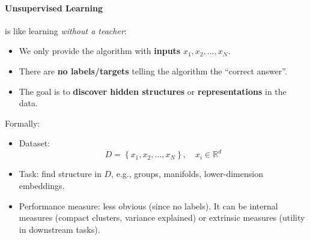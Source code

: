 \paragraph{Unsupervised Learning}\label{sec:unsupervised-learning}

 is like learning \emph{without a teacher}:
\begin{itemize}
    \item We only provide the algorithm with \textbf{inputs} $x_{1}, x_{2}, \dots, x_{N}$.
    \item There are \textbf{no labels/targets} telling the algorithm the ``correct answer''.
    \item The goal is to \textbf{discover hidden structures} or \textbf{representations} in the data.
\end{itemize}
Formally:
\begin{itemize}
    \item Dataset:
    \begin{equation*}
        D = \left\{x_{1}, x_{2}, \dots, x_{N}\right\}, \quad x_{i} \in \mathbb{R}^{d}
    \end{equation*}
    \item Task: find structure in $D$, e.g., groups, manifolds, lower-dimension embeddings.
    \item Performance measure: less obvious (since no labels). It can be internal measures (compact clusters, variance explained) or extrinsic measures (utility in downstream tasks).
\end{itemize}

